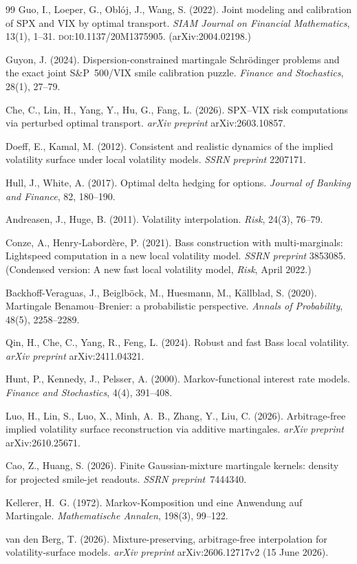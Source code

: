 \documentclass[11pt]{article}
\providecommand{\1}{\mathbf 1}
\begin{document}
{\begin{thebibliography}{99}
Guo, I., Loeper, G., Obl\'oj, J., Wang, S. (2022).
Joint modeling and calibration of SPX and VIX by optimal transport.
\textit{SIAM Journal on Financial Mathematics}, 13(1), 1--31.
\textsc{doi}:10.1137/20M1375905. (arXiv:2004.02198.)

Guyon, J. (2024).
Dispersion-constrained martingale Schr\"odinger problems and the exact joint S\&P~500/VIX smile
calibration puzzle. \textit{Finance and Stochastics}, 28(1), 27--79.

Che, C., Lin, H., Yang, Y., Hu, G., Fang, L. (2026). SPX--VIX risk computations via perturbed optimal
transport. \textit{arXiv preprint} arXiv:2603.10857.

 Doeff, E., Kamal, M. (2012). Consistent and realistic dynamics of the implied volatility surface under local volatility models. \emph{SSRN preprint} 2207171.

Hull, J., White, A. (2017). Optimal delta hedging for options.
\textit{Journal of Banking and Finance}, 82, 180--190.

Andreasen, J., Huge, B. (2011). Volatility interpolation. \textit{Risk}, 24(3), 76--79.

Conze, A., Henry-Labord\`ere, P. (2021). Bass construction with multi-marginals: Lightspeed
computation in a new local volatility model. \textit{SSRN preprint} 3853085. (Condensed version:
A new fast local volatility model, \textit{Risk}, April 2022.)

Backhoff-Veraguas, J., Beiglb\"ock, M., Huesmann, M., K\"allblad, S. (2020). Martingale
Benamou--Brenier: a probabilistic perspective. \textit{Annals of Probability}, 48(5), 2258--2289.

Qin, H., Che, C., Yang, R., Feng, L. (2024). Robust and fast Bass local volatility.
\textit{arXiv preprint} arXiv:2411.04321.

Hunt, P., Kennedy, J., Pelsser, A. (2000). Markov-functional interest rate models.
\textit{Finance and Stochastics}, 4(4), 391--408.

 Luo, H., Lin, S., Luo, X., Minh, A.~B., Zhang, Y., Liu, C. (2026).
Arbitrage-free implied volatility surface reconstruction via additive martingales.
\textit{arXiv preprint} arXiv:2610.25671.

 Cao, Z., Huang, S. (2026). Finite Gaussian-mixture martingale kernels:
density for projected smile-jet readouts. \textit{SSRN preprint}~7444340.

 Kellerer, H.~G. (1972). Markov-Komposition und eine Anwendung auf
Martingale. \textit{Mathematische Annalen}, 198(3), 99--122.

van den Berg, T. (2026). Mixture-preserving, arbitrage-free interpolation for volatility-surface
models. \textit{arXiv preprint} arXiv:2606.12717v2 (15 June 2026).

\end{thebibliography}}
\end{document}
